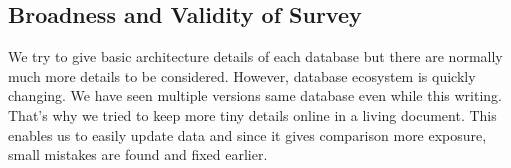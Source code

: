 \subsection{Broadness and Validity of Survey}

We try to give basic architecture details of each database but there are normally much more details to be considered. However, database ecosystem is quickly changing. We have seen multiple versions same database even while this writing. That's why we tried to keep more tiny details online in a living document. This enables us to easily update data and since it gives comparison more exposure, small mistakes are found and fixed earlier.

